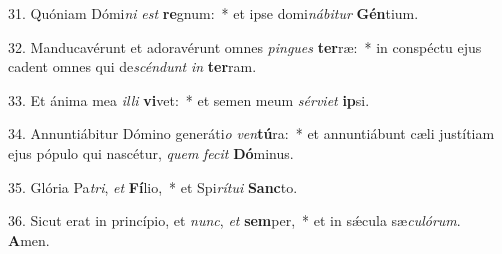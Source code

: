 31. Quóniam Dómi\textit{ni} \textit{est} \textbf{re}gnum:~*  et ipse domi\textit{ná}\textit{bi}\textit{tur} \textbf{Gén}tium.\

32. Manducavérunt et adoravérunt omnes \textit{pin}\textit{gues} \textbf{ter}ræ:~*  in conspéctu ejus cadent omnes qui de\textit{scén}\textit{dunt} \textit{in} \textbf{ter}ram.\

33. Et ánima mea \textit{il}\textit{li} \textbf{vi}vet:~*  et semen meum \textit{sér}\textit{vi}\textit{et} \textbf{ip}si.\

34. Annuntiábitur Dómino generáti\textit{o} \textit{ven}\textbf{tú}ra:~*  et annuntiábunt cæli justítiam ejus pópulo qui nascétur, \textit{quem} \textit{fe}\textit{cit} \textbf{Dó}minus.\

35. Glória Pa\textit{tri}, \textit{et} \textbf{Fí}lio,~*  et Spi\textit{rí}\textit{tu}\textit{i} \textbf{Sanc}to.\

36. Sicut erat in princípio, et \textit{nunc}, \textit{et} \textbf{sem}per,~*  et in sǽcula sæ\textit{cu}\textit{ló}\textit{rum}. \textbf{A}men.\

